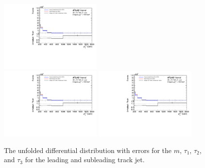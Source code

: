 \begin{figure}[h!]
  \includegraphics[page=964,width=0.45\textwidth]{figures/IBUPlots.pdf} \\
  \includegraphics[page=724,width=0.45\textwidth]{figures/IBUPlots.pdf}
  \includegraphics[page=1004,width=0.45\textwidth]{figures/IBUPlots.pdf}
  \caption{The unfolded differential distribution with errors for the $m$, $\tau_1$, $\tau_2$, and $\tau_3$ for the leading and subleading track jet.}
  \label{fig:unfoldErr3}
\end{figure}
